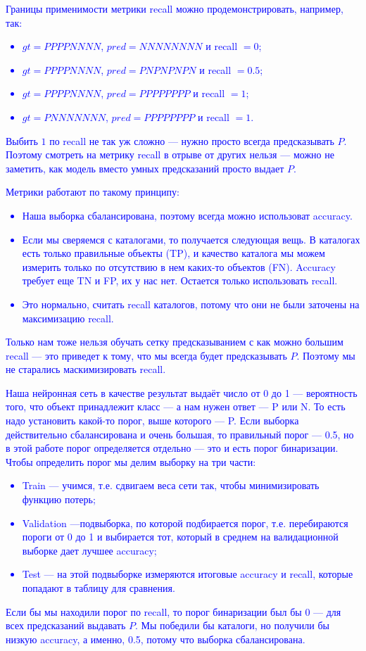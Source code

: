 \documentclass[
aps,%
12pt,%
final,%
notitlepage,%
oneside,%
onecolumn,%
nobibnotes,%
nofootinbib,%
superscriptaddress,%
noshowpacs,%
centertags]%
{revtex4}
\begin{document}
\textcolor{blue}{Границы применимости метрики recall можно продемонстрировать, например, так:
\begin{itemize}
  \item $gt = PPPPNNNN$, $pred = NNNNNNNN$ и recall $= 0$;
  \item $gt = PPPPNNNN$, $pred=PNPNPNPN$ и recall $= 0.5$;
  \item $gt = PPPPNNNN$, $pred=PPPPPPPP$ и recall $= 1$;
  \item $gt = PNNNNNNN$, $pred=PPPPPPPP$ и recall $= 1$.
\end{itemize}}

\textcolor{blue}{Выбить $1$ по recall не так уж сложно --- нужно просто всегда предсказывать $P$. Поэтому смотреть на метрику recall в отрыве от других нельзя --- можно не заметить, как модель вместо умных предсказаний просто выдает $P$.}

\textcolor{blue}{Метрики работают по такому принципу:
\begin{itemize}
\item Наша выборка сбалансирована, поэтому всегда можно использоват accuracy.
\item Если мы сверяемся с каталогами, то получается следующая вещь. В каталогах есть только правильные объекты (TP), и качество каталога мы можем измерить только по отсутствию в нем каких-то объектов (FN). Accuracy требует еще TN и FP, их у нас нет. Остается только использовать recall.
\item Это нормально, считать recall каталогов, потому что они не были заточены на максимизацию recall. 
\end{itemize}}

\textcolor{blue}{Только нам тоже нельзя обучать сетку предсказыванием с как можно большим recall --- это приведет к тому, что мы всегда будет предсказывать $P$. Поэтому мы не старались маскимизировать recall.}

\textcolor{blue}{Наша нейронная сеть в качестве результат выдаёт число от 0 до 1 --- вероятность того, что объект принадлежит класс --- а нам нужен ответ --- P или N. То есть надо установить какой-то порог, выше которого --- P. Если выборка действительно сбалансирована и очень большая, то правильный порог --- 0.5, но в этой работе порог определяется отдельно --- это и есть порог бинаризации. Чтобы определить порог мы делим выборку на три части: }
\textcolor{blue}{\begin{itemize}
\item Train --- учимся, т.е. сдвигаем веса сети так, чтобы минимизировать функцию потерь; 
\item Validation ---подвыборка, по которой подбирается порог, т.е. перебираются пороги от 0 до 1 и выбирается тот, который в среднем на валидационной выборке дает лучшее accuracy;
\item Test --- на этой подвыборке измеряются итоговые accuracy и recall, которые попадают в таблицу для сравнения.
\end{itemize}}

\textcolor{blue}{Если бы мы находили порог по recall, то порог бинаризации был бы 0 --- для всех предсказаний выдавать $P$. Мы победили бы каталоги, но получили бы низкую accuracy, а именно, 0.5, потому что выборка сбалансирована.}
\end{document}

